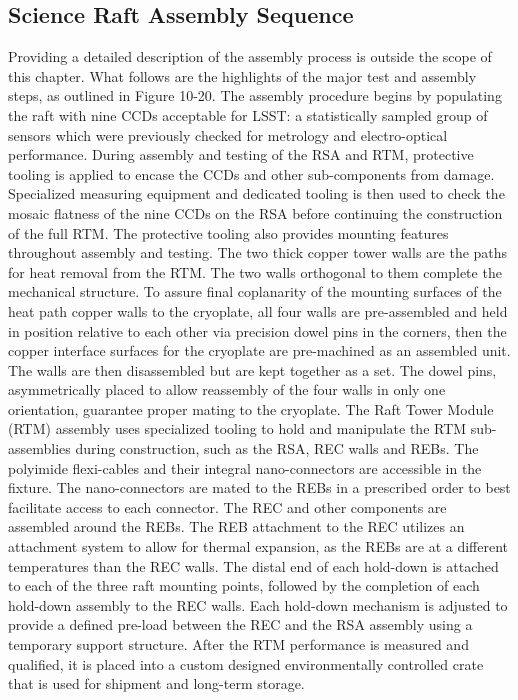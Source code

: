 \subsection{Science Raft Assembly Sequence}
Providing a detailed description of the assembly process is outside the scope of this chapter. What follows are the highlights of the major test and assembly steps, as outlined in Figure 10-20.
The assembly procedure begins by populating the raft with nine CCDs acceptable for LSST: a statistically sampled group of sensors which were previously checked for metrology and electro-optical performance. During assembly and testing of the RSA and RTM, protective tooling is applied to encase the CCDs and other sub-components from damage. Specialized measuring equipment and dedicated tooling is then used to check the mosaic flatness of the nine CCDs on the RSA before continuing the construction of the full RTM. The protective tooling also provides mounting features throughout assembly and testing.
The two thick copper tower walls are the paths for heat removal from the RTM. The two walls orthogonal to them complete the mechanical structure. To assure final coplanarity of the mounting surfaces of the heat path copper walls to the cryoplate, all four walls are pre-assembled and held in position relative to each other via precision dowel pins in the corners, then the copper interface surfaces for the cryoplate are pre-machined as an assembled unit. The walls are then disassembled but are kept together as a set. The dowel pins, asymmetrically placed to allow reassembly of the four walls in only one orientation, guarantee proper mating to the cryoplate.
The Raft Tower Module (RTM) assembly uses specialized tooling to hold and manipulate the RTM sub-assemblies during construction, such as the RSA, REC walls and REBs. The polyimide flexi-cables and their integral nano-connectors are accessible in the fixture. The nano-connectors are mated to the REBs in a prescribed order to best facilitate access to each connector. The REC and other components are assembled around the REBs. The REB attachment to the REC utilizes an attachment system to allow for thermal expansion, as the REBs are at a different temperatures than the REC walls. The distal end of each hold-down is attached to each of the three raft mounting points, followed by the completion of each hold-down assembly to the REC walls. Each hold-down mechanism is adjusted to provide a defined pre-load between the REC and the RSA assembly using a temporary support structure. After the RTM performance is measured and qualified, it is placed into a custom designed environmentally controlled crate that is used for shipment and long-term storage.

